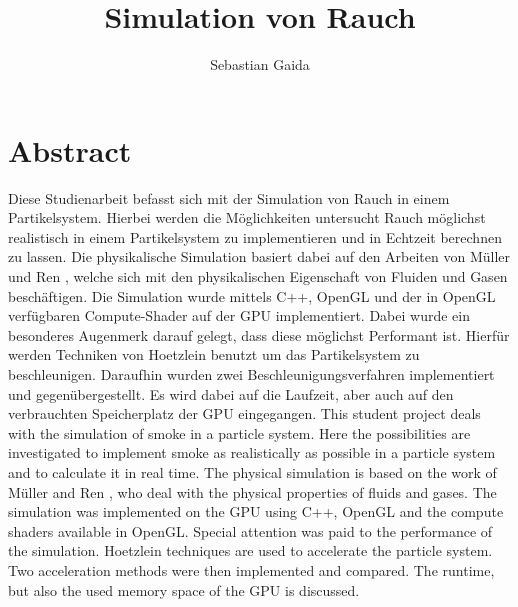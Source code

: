 \documentclass[intern,palatino]{cgBA}
\author{Sebastian Gaida}
\title{Simulation von Rauch}
\begin{document}
	\maketitle
	\newpage
	
	
	
	\section*{Abstract}\label{abstract}
	
	Diese Studienarbeit befasst sich mit der Simulation von Rauch in einem Partikelsystem. Hierbei werden die Möglichkeiten untersucht Rauch möglichst realistisch in einem Partikelsystem zu implementieren und in Echtzeit berechnen zu lassen. Die physikalische Simulation basiert dabei auf den Arbeiten von  Müller \cite{muller2003particle} und Ren \cite{ren2016fast}, welche sich mit den physikalischen Eigenschaft von Fluiden und Gasen beschäftigen. Die Simulation wurde mittels C++, OpenGL und der in OpenGL verfügbaren Compute-Shader auf der GPU implementiert. Dabei wurde ein besonderes Augenmerk darauf gelegt, dass diese möglichst Performant ist. Hierfür werden Techniken von Hoetzlein \cite{nvidia} benutzt um das Partikelsystem zu beschleunigen. Daraufhin wurden zwei Beschleunigungsverfahren implementiert und gegenübergestellt. Es wird dabei auf die Laufzeit, aber auch auf den verbrauchten Speicherplatz der GPU eingegangen.
	\newline \newline
	This student project deals with the simulation of smoke in a particle system. Here the possibilities are investigated to implement smoke as realistically as possible in a particle system and to calculate it in real time. The physical simulation is based on the work of Müller \cite{muller2003particle} and Ren \cite{ren2016fast}, who deal with the physical properties of fluids and gases. The simulation was implemented on the GPU using C++, OpenGL and the compute shaders available in OpenGL. Special attention was paid to the performance of the simulation. Hoetzlein \cite{nvidia} techniques are used to accelerate the particle system. Two acceleration methods were then implemented and compared. The runtime, but also the used memory space of the GPU is discussed.
	
	\newpage
	
	\tableofcontents
	\clearpage
	
	\captionsetup{font=it}
\end{document}
